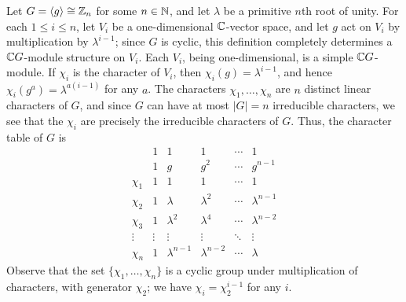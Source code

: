 \documentclass[../Odyssey_Project.tex]{subfiles}
\begin{document}
\begin{example}
\label{ex:15.eg.1}
Let $G = \langle g \rangle \cong \mathbb{Z}_n$ for some $n \in \mathbb{N}$, and let $\lambda$ be a primitive $n$th root of unity. For each $1 \leq i \leq n$, let $V_i$ be a one-dimensional $\mathbb{C}$-vector space, and let $g$ act on $V_i$ by multiplication by $\lambda^{i-1}$; since $G$ is cyclic, this definition completely determines a $\mathbb{C} G$-module structure on $V_i$. Each $V_i$, being one-dimensional, is a simple $\mathbb{C} G$-module. If $\chi_i$ is the character of $V_i$, then $\chi_i(g) = \lambda^{i-1}$, and hence $\chi_i(g^a) = \lambda^{a(i-1)}$ for any $a$. The characters $\chi_1, \ldots, \chi_n$ are $n$ distinct linear characters of $G$, and since $G$ can have at most $|G| = n$ irreducible characters, we see that the $\chi_i$ are precisely the irreducible characters of $G$. Thus, the character table of $G$ is
\[
    \begin{array}{c|ccccc}
        & 1 & 1 & 1 & \cdots & 1 \\
        & 1 & g & g^2 & \cdots & g^{n-1} \\
        \hline
        \chi_1 & 1 & 1 & 1 & \cdots & 1 \\
        \chi_2 & 1 & \lambda & \lambda^2 & \cdots & \lambda^{n-1} \\
        \chi_3 & 1 & \lambda^2 & \lambda^4 & \cdots & \lambda^{n-2} \\
        \vdots & \vdots & \vdots & \vdots & \ddots & \vdots \\
        \chi_n & 1 & \lambda^{n-1} & \lambda^{n-2} & \cdots & \lambda
    \end{array}
\]
Observe that the set $\{\chi_1, \ldots, \chi_n\}$ is a cyclic group under multiplication of characters, with generator $\chi_2$; we have $\chi_i = \chi_2^{i-1}$ for any $i$.
\end{example}
\end{document}
